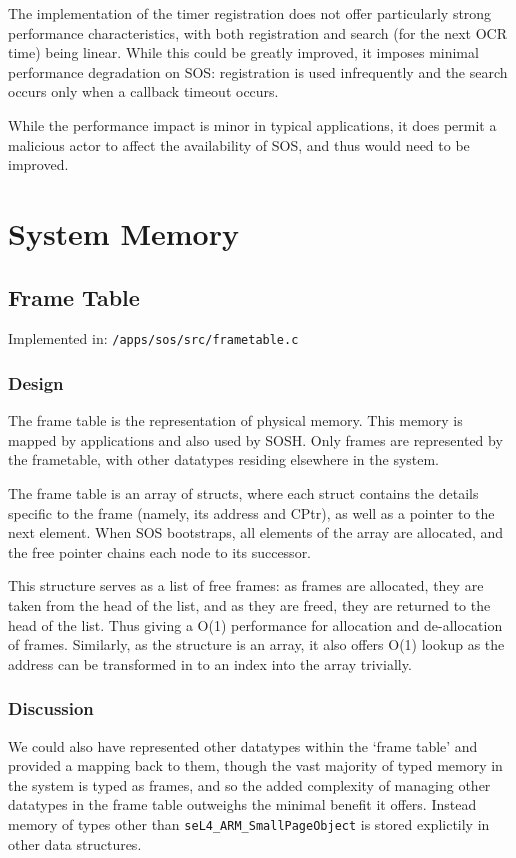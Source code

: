 \documentclass[a4paper,12pt]{article}
\begin{document}
The implementation of the timer registration does not offer particularly
strong performance characteristics, with both registration and search (for the
next OCR time) being linear.  While this could be greatly improved, it imposes
minimal performance degradation on SOS: registration is used infrequently and
the search occurs only when a callback timeout occurs.

While the performance impact is minor in typical applications, it does permit
a malicious actor to affect the availability of SOS, and thus would need to be
improved.

\section{System Memory}
\subsection{Frame Table}
Implemented in: \texttt{/apps/sos/src/frametable.c}
\subsubsection{Design}
The frame table is the representation of physical memory. This memory is
mapped by applications and also used by SOSH.  Only frames are represented by
the frametable, with other datatypes residing elsewhere in the system.

The frame table is an array of structs, where each struct contains the details
specific to the frame (namely, its address and CPtr), as well as a pointer to
the next element.  When SOS bootstraps, all elements of the array are
allocated, and the free pointer chains each node to its successor.

This structure serves as a list of free frames: as frames are allocated, they
are taken from the head of the list, and as they are freed, they are returned
to the head of the list.  Thus giving a O(1) performance for allocation and
de-allocation of frames.  Similarly, as the structure is an array, it also
offers O(1) lookup as the address can be transformed in to an index into the
array trivially.

\subsubsection{Discussion}
We could also have represented other datatypes within the `frame table' and
provided a mapping back to them, though the vast majority of typed memory in
the system is typed as frames, and so the added complexity of managing other
datatypes in the frame table outweighs the minimal benefit it offers.  Instead
memory of types other than \texttt{seL4\_ARM\_SmallPageObject} is stored
explictily in other data structures.
\end{document}
